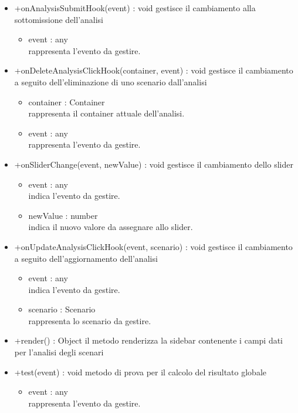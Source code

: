 \begin{itemize}
\begin{itemize}
		\item +onAnalysisSubmitHook(event) : void\newline
		gestisce il cambiamento alla sottomissione dell'analisi
		\begin{itemize}
			\item event : any\\
			rappresenta l'evento da gestire.
		\end{itemize}
		\item +onDeleteAnalysisClickHook(container, event) : void\newline
		gestisce il cambiamento a seguito dell'eliminazione di uno scenario dall'analisi
		\begin{itemize}
			\item container : Container\\
			rappresenta il container attuale dell'analisi.
			\item event : any\\
			rappresenta l'evento da gestire.
		\end{itemize}
		\item +onSliderChange(event, newValue) : void\newline
		gestisce il cambiamento dello slider
		\begin{itemize}
			\item event : any\\
			indica l'evento da gestire.
			\item newValue : number\\
			indica il nuovo valore da assegnare allo slider.
		\end{itemize}
		\item +onUpdateAnalysisClickHook(event, scenario) : void\newline
		gestisce il cambiamento a seguito dell'aggiornamento dell'analisi
		
		\begin{itemize}
			\item event : any\\
			indica l'evento da gestire.
			\item scenario : Scenario\\
			rappresenta lo scenario da gestire.
		\end{itemize}
		\item +render() : Object\newline
		il metodo renderizza la sidebar contenente i campi dati per l'analisi degli scenari
		
		\item +test(event) : void\newline
		metodo di prova per il calcolo del risultato globale
		\begin{itemize}
			\item event : any\\
			rappresenta l'evento da gestire.
		\end{itemize}
	\end{itemize}
\end{itemize}
